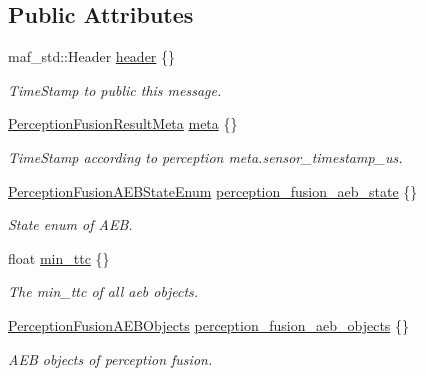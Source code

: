 \subsection*{Public Attributes}
\begin{DoxyCompactItemize}
\item 
maf\+\_\+std\+::\+Header \hyperlink{structmaf__perception__interface_1_1PerceptionFusionAEBResult_adbb84532138c2f3b8e85f089e5ff643d}{header} \{\}
\begin{DoxyCompactList}\small\item\em Time\+Stamp to public this message. \end{DoxyCompactList}\item 
\hyperlink{structmaf__perception__interface_1_1PerceptionFusionResultMeta}{Perception\+Fusion\+Result\+Meta} \hyperlink{structmaf__perception__interface_1_1PerceptionFusionAEBResult_a15081ef0e066099034e20869485a4ff0}{meta} \{\}
\begin{DoxyCompactList}\small\item\em Time\+Stamp according to perception meta.\+sensor\+\_\+timestamp\+\_\+us. \end{DoxyCompactList}\item 
\hyperlink{structmaf__perception__interface_1_1PerceptionFusionAEBStateEnum}{Perception\+Fusion\+A\+E\+B\+State\+Enum} \hyperlink{structmaf__perception__interface_1_1PerceptionFusionAEBResult_ada30dc8a268479ec0e62bab3080c898c}{perception\+\_\+fusion\+\_\+aeb\+\_\+state} \{\}
\begin{DoxyCompactList}\small\item\em State enum of A\+EB. \end{DoxyCompactList}\item 
float \hyperlink{structmaf__perception__interface_1_1PerceptionFusionAEBResult_a857828cd14b420705462d9c361ce725b}{min\+\_\+ttc} \{\}
\begin{DoxyCompactList}\small\item\em The min\+\_\+ttc of all aeb objects. \end{DoxyCompactList}\item 
\hyperlink{structmaf__perception__interface_1_1PerceptionFusionAEBObjects}{Perception\+Fusion\+A\+E\+B\+Objects} \hyperlink{structmaf__perception__interface_1_1PerceptionFusionAEBResult_a1ad48f787240f32d40ccb2a375712745}{perception\+\_\+fusion\+\_\+aeb\+\_\+objects} \{\}
\begin{DoxyCompactList}\small\item\em A\+EB objects of perception fusion. \end{DoxyCompactList}\end{DoxyCompactItemize}



